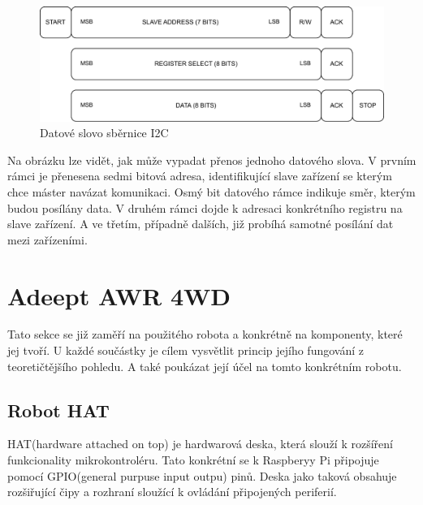 \begin{figure}[h!]
	\centering
	\includegraphics[scale=0.75]{obrazky-figures/i2c_data_word.pdf}
	\caption{Datové slovo sběrnice I2C}
	\label{}
\end{figure}

Na obrázku lze vidět, jak může vypadat přenos jednoho datového slova. V prvním rámci je přenesena sedmi bitová adresa, identifikující slave zařízení se kterým chce máster navázat komunikaci. Osmý bit datového rámce indikuje směr, kterým budou posílány data. V druhém rámci dojde k adresaci konkrétního registru na slave zařízení. A ve třetím, případně dalších, již probíhá samotné posílání dat mezi zařízeními. \cite{an4481}

\section{Adeept AWR 4WD}
Tato sekce se již zaměří na použitého robota a konkrétně na komponenty, které jej tvoří. U každé součástky je cílem vysvětlit princip jejího fungování z teoretičtějšího pohledu. A také poukázat její účel na tomto konkrétním robotu.

\subsection*{Robot HAT}
HAT(hardware attached on top) je hardwarová deska, která slouží k rozšíření funkcionality mikrokontroléru. Tato konkrétní se k Raspberyy Pi připojuje pomocí GPIO(general purpuse input outpu) pinů. Deska jako taková obsahuje rozšiřující čipy a rozhraní sloužící k ovládání připojených periferií.

